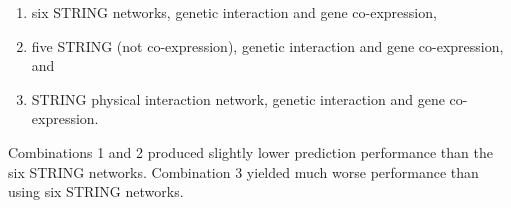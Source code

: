 \begin{enumerate}
    \item six STRING networks, genetic interaction and gene co-expression,
    \item five STRING (not co-expression), genetic interaction and gene co-expression, and
    \item STRING physical interaction network, genetic interaction and gene co-expression.
\end{enumerate}

Combinations 1 and 2 produced slightly lower prediction performance than the six STRING networks.
Combination 3 yielded much worse performance than using six STRING networks.

%
%
%
%

